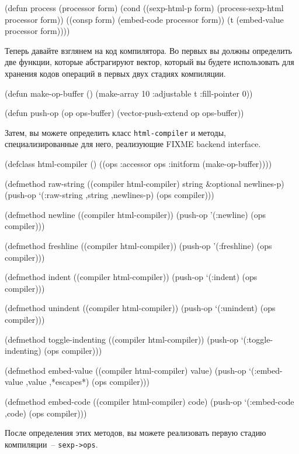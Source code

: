 \begin{myverb}
(defun process (processor form)
  (cond
    ((sexp-html-p form) (process-sexp-html processor form))
    ((consp form)       (embed-code processor form))
    (t                  (embed-value processor form))))
\end{myverb}

Теперь давайте взглянем на код компилятора.  Во первых вы должны определить две функции,
которые абстрагируют вектор, который вы будете использовать для хранения кодов операций в
первых двух стадиях компиляции.

\begin{myverb}
(defun make-op-buffer () (make-array 10 :adjustable t :fill-pointer 0))

(defun push-op (op ops-buffer) (vector-push-extend op ops-buffer))
\end{myverb}

Затем, вы можете определить класс \lstinline{html-compiler} и методы, специализированные для
него, реализующие FIXME backend interface.

\begin{myverb}
(defclass html-compiler ()
  ((ops :accessor ops :initform (make-op-buffer))))

(defmethod raw-string ((compiler html-compiler) string &optional newlines-p)
  (push-op `(:raw-string ,string ,newlines-p) (ops compiler)))

(defmethod newline ((compiler html-compiler))
  (push-op '(:newline) (ops compiler)))

(defmethod freshline ((compiler html-compiler))
  (push-op '(:freshline) (ops compiler)))

(defmethod indent ((compiler html-compiler))
  (push-op `(:indent) (ops compiler)))

(defmethod unindent ((compiler html-compiler))
  (push-op `(:unindent) (ops compiler)))

(defmethod toggle-indenting ((compiler html-compiler))
  (push-op `(:toggle-indenting) (ops compiler)))

(defmethod embed-value ((compiler html-compiler) value)
  (push-op `(:embed-value ,value ,*escapes*) (ops compiler)))

(defmethod embed-code ((compiler html-compiler) code)
  (push-op `(:embed-code ,code) (ops compiler)))
\end{myverb}

После определения этих методов, вы можете реализовать первую стадию компиляции~--
\lstinline{sexp->ops}.

